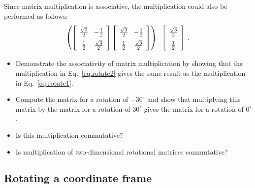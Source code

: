 Since matrix multiplication is associative, the multiplication could also be performed as follows:
\begin{equation}\label{eq.rotate2}
\spacearray
\left(\left[\begin{array}{cc}\frac{\sqrt{3}}{2}&-\frac{1}{2}\\\frac{1}{2}&\frac{\sqrt{3}}{2}\end{array}\right]
\left[\begin{array}{cc}\frac{\sqrt{3}}{2}&-\frac{1}{2}\\\frac{1}{2}&\frac{\sqrt{3}}{2}\end{array}\right]\right)\;\;
\left[\begin{array}{c}\frac{\sqrt{3}}{2}\\\frac{1}{2}\end{array}\right]\,.
\end{equation}

\begin{framed}
\begin{itemize}
\item Demonstrate the associativity of matrix multiplication by showing that the multiplication in Eq.~\ref{eq.rotate2} gives the same result as the multiplication in Eq.~\ref{eq.rotate1}.
\item Compute the matrix for a rotation of $-30^{\circ}$ and show that multiplying this matrix by the matrix for a rotation of $30^{\circ}$ gives the matrix for a rotation of $0^{\circ}$.
\item Is this multiplication commutative?
\item Is multiplication of two-dimensional rotational matrices commutative?
\end{itemize}
\end{framed}

\subsection{Rotating a coordinate frame}

